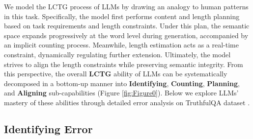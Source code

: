 \label{sec:Decomposing Length Control Errors}
We model the LCTG process of LLMs by drawing an analogy to human patterns in this task. Specifically, the model first performs content and length planning based on task requirements and length constraints. Under this plan, the semantic space expands progressively at the word level during generation, accompanied by an implicit counting process. Meanwhile, length estimation acts as a real-time constraint, dynamically regulating further extension. Ultimately, the model strives to align the length constraints while preserving semantic integrity. From this perspective, the overall \textbf{LCTG} ability of LLMs can be systematically decomposed in a bottom-up manner into \textbf{Identifying}, \textbf{Counting}, \textbf{Planning}, and \textbf{Aligning} sub-capabilities (Figure \ref{fig:Figure0}). 
Below we explore LLMs' mastery of these abilities through detailed error 
analysis on TruthfulQA dataset \citep{TruthfulQA}.

\subsection{Identifying Error}
\label{sec:identifying_error}


